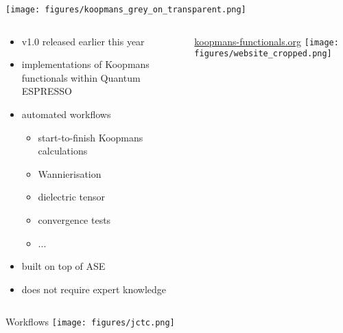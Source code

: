 \documentclass[xcolor=table,aspectratio=169]{beamer}
\numberwithin{equation}{section}
\begin{document}
\begin{frame}{}
   \begin{center}
      \texttt{[image: figures/koopmans\_grey\_on\_transparent.png]}
   \end{center}

   \vspace{-2ex}

   \begin{columns}
      \begin{column}{0.55\textwidth}
         \begin{itemize}
            \item v1.0 released earlier this year\footnotemark[1]
            \item implementations of Koopmans functionals within Quantum ESPRESSO
            \item automated workflows
                  \begin{itemize}
                     \item start-to-finish Koopmans calculations
                     \item Wannierisation
                     \item dielectric tensor
                     \item convergence tests
                     \item ...
                  \end{itemize}
            \item built on top of ASE\footnotemark[2]
            \item does not require expert knowledge
         \end{itemize}
      \end{column}

      \begin{column}{0.4\textwidth}
         \centering
         \url{koopmans-functionals.org}
         \texttt{[image: figures/website\_cropped.png]}
      \end{column}
   \end{columns}
\end{frame}

\begin{frame}{Workflows}
   \texttt{[image: figures/jctc.png]}
   
\end{frame}
\end{document}
